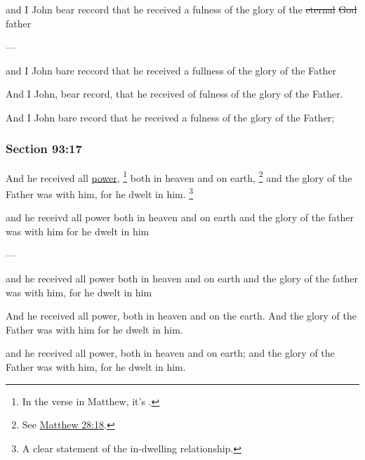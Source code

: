 		\begin{framed}
		\scriptsize
			\begin{compactdesc}
				\item[JSP] and I John bear reccord that he received a fulness of the glory of the \sout{eternal} \sout{God} father
				\item[BC] ---
				\item[RB2] and I John bare reccord that he received a fullness of the glory of the Father
				\item[RB1] And I John, bear record, that he received of fulness of the glory of the Father. 
				\item[DC 1835] And I John bare record that he received a fulness of the glory of the Father; 
			\end{compactdesc}
		\end{framed}

	\subsubsection{Section 93:17} %
		\label{DC93-17}

		And he received all \hyperref[POWER]{power},%
			\footnote{%
				In the verse in Matthew, it's \gr{ἐξουσία}.
				}
		both in heaven and on earth,%
			\footnote{%
				See \hyperref[MATTHEW-28-18]{Matthew 28:18}.
				}
		and the glory of the Father was with him, for he dwelt in him.%
			\footnote{%
				A clear statement of the in-dwelling relationship.
				}

		\begin{framed}
		\scriptsize
			\begin{compactdesc}
				\item[JSP] and he receivd all power both in heaven and on earth and the glory of the father was with him for he dwelt in him
				\item[BC] ---
				\item[RB2] and he received all power both in heaven and on earth and the glory of the father was with him, for he dwelt in him
				\item[RB1] And he received all power, both in heaven and on the earth. And the glory of the Father was with him for he dwelt in him. 
				\item[DC 1835] and he received all power, both in heaven and on earth; and the glory of the Father was with him, for he dwelt in him.
			\end{compactdesc}
		\end{framed}

